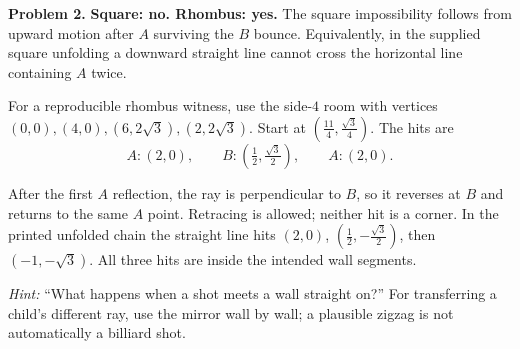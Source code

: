\documentclass[11pt,letterpaper]{article}
\newcommand{\answer}[1]{\par\vspace{3pt}\textbf{Problem #1.} }
\begin{document}
\answer{2} \textbf{Square: no. Rhombus: yes.} The square impossibility follows from upward motion after $A$ surviving the $B$ bounce. Equivalently, in the supplied square unfolding a downward straight line cannot cross the horizontal line containing $A$ twice.

For a reproducible rhombus witness, use the side-$4$ room with vertices $(0,0),(4,0),(6,2\sqrt3),(2,2\sqrt3)$. Start at $(\frac{11}{4},\frac{\sqrt3}{4})$. The hits are
\[
 A:(2,0),\qquad B:(\tfrac12,\tfrac{\sqrt3}{2}),\qquad A:(2,0).
\]
\begin{center}
\end{center}
After the first $A$ reflection, the ray is perpendicular to $B$, so it reverses at $B$ and returns to the same $A$ point. Retracing is allowed; neither hit is a corner. In the printed unfolded chain the straight line hits $(2,0)$, $(\frac12,-\frac{\sqrt3}{2})$, then $(-1,-\sqrt3)$. All three hits are inside the intended wall segments.

\textit{Hint:} ``What happens when a shot meets a wall straight on?'' For transferring a child's different ray, use the mirror wall by wall; a plausible zigzag is not automatically a billiard shot.
\end{document}
